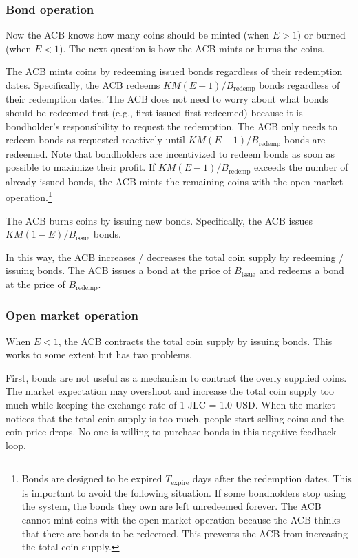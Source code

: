 \documentclass[dvipdfmx,a4paper]{article}
\begin{document}
\subsubsection{Bond operation}

Now the ACB knows how many coins should be minted (when $E>1$) or burned (when $E<1$). The next question is how the ACB mints or burns the coins.

The ACB mints coins by redeeming issued bonds regardless of their redemption dates. Specifically, the ACB redeems $KM(E-1)/B_{\mathrm{redemp}}$ bonds regardless of their redemption dates. The ACB does not need to worry about what bonds should be redeemed first (e.g., first-issued-first-redeemed) because it is bondholder's responsibility to request the redemption. The ACB only needs to redeem bonds as requested reactively until $KM(E-1)/B_{\mathrm{redemp}}$ bonds are redeemed. Note that bondholders are incentivized to redeem bonds as soon as possible to maximize their profit. If $KM(E-1)/B_{\mathrm{redemp}}$ exceeds the number of already issued bonds, the ACB mints the remaining coins with the open market operation.\footnote{Bonds are designed to be expired $T_{\mathrm{expire}}$ days after the redemption dates. This is important to avoid the following situation. If some bondholders stop using the system, the bonds they own are left unredeemed forever. The ACB cannot mint coins with the open market operation because the ACB thinks that there are bonds to be redeemed. This prevents the ACB from increasing the total coin supply.}

The ACB burns coins by issuing new bonds. Specifically, the ACB issues $KM(1-E)/B_{\mathrm{issue}}$ bonds.

In this way, the ACB increases / decreases the total coin supply by redeeming / issuing bonds. The ACB issues a bond at the price of $B_{\mathrm{issue}}$ and redeems a bond at the price of $B_{\mathrm{redemp}}$.

\subsubsection{Open market operation}

When $E<1$, the ACB contracts the total coin supply by issuing bonds. This works to some extent but has two problems.

First, bonds are not useful as a mechanism to contract the overly supplied coins. The market expectation may overshoot and increase the total coin supply too much while keeping the exchange rate of 1 JLC = 1.0 USD. When the market notices that the total coin supply is too much, people start selling coins and the coin price drops. No one is willing to purchase bonds in this negative feedback loop.
\end{document}
